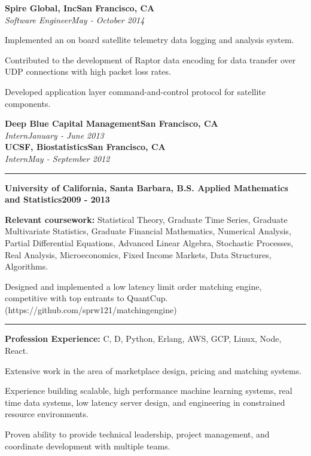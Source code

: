 \documentclass{article}
\newcommand{\ressection}[1]{\noindent{\large\textbf{#1}}\vspace{2pt}\hrule\vspace{4pt}}
\newcommand{\leftandright}[2]{\noindent\textbf{#1}\hfill\textbf{#2}}
\newcommand{\leftandrighti}[2]{\indent\textit{#1}\hfill\textit{#2}}
\begin{document}
\leftandright{Spire Global, Inc}{San Francisco, CA} \\
\leftandrighti{Software Engineer}{May - October 2014}

\begin{itemize*}
\item Implemented an on board satellite telemetry data logging and analysis system.
\item Contributed to the development of Raptor data encoding for data transfer over
  UDP connections with high packet loss rates.
\item Developed application layer command-and-control protocol for satellite components.
\end{itemize*}

\leftandright{Deep Blue Capital Management}{San Francisco, CA} \\
\leftandrighti{Intern}{January - June 2013}\\

\leftandright{UCSF, Biostatistics}{San Francisco, CA} \\
\leftandrighti{Intern}{May - September 2012}\\

\ressection{Education}

\leftandright{University of California, Santa Barbara, \textmd{B.S. Applied
    Mathematics and Statistics}}{2009 - 2013}
\begin{itemize*}
\item \textbf{Relevant coursework:} Statistical Theory, Graduate Time Series,
  Graduate Multivariate Statistics, Graduate Financial Mathematics,
  Numerical Analysis, Partial Differential Equations,
  Advanced Linear Algebra, Stochastic Processes, Real Analysis,
  Microeconomics, Fixed Income Markets, Data Structures, Algorithms.
\item Designed and implemented a low latency limit order matching engine,
  competitive with top entrants to QuantCup.
  (https://github.com/sprw121/matching\textunderscore engine)
\end{itemize*}

\vspace{1.0em}

\ressection{Skills}

\begin{itemize*}
\item \textbf{Profession Experience:} C, D, Python, Erlang, AWS, GCP, Linux, Node, React.
\item Extensive work in the area of marketplace design, pricing and matching systems.
\item Experience building scalable, high performance machine learning systems,
  real time data systems, low latency server design, and engineering in
  constrained resource environments.
\item Proven ability to provide technical leadership, project management,
  and coordinate development with multiple teams.
\end{itemize*}
\end{document}
